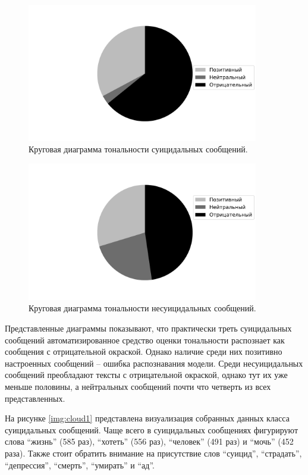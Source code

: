 \begin{figure}[H]
	\centering
	\includegraphics[width=0.9\textwidth]{inc/plots/sentiments_suicidal_monochrome.pdf}
	\caption{ Круговая диаграмма тональности суицидальных сообщений. }
	\label{img:sentiments1}
\end{figure}

\begin{figure}[H]
	\centering
	\includegraphics[width=0.9\textwidth]{inc/plots/sentiments_non_suicidal_monochrome.pdf}
	\caption{ Круговая диаграмма тональности несуицидальных сообщений. }
	\label{img:sentiments2}
\end{figure}

Представленные диаграммы показывают, что практически треть суицидальных сообщений автоматизированное средство оценки тональности распознает как сообщения с отрицательной окраской. Однако наличие среди них позитивно настроенных сообщений -- ошибка распознавания модели. Среди несуицидальных сообщений преобладают тексты с отрицательной окраской, однако тут их уже меньше половины, а нейтральных сообщений почти что четверть из всех представленных. 

На рисунке \ref{img:cloud1} представлена визуализация собранных данных класса суицидальных сообщений. Чаще всего в суицидальных сообщениях фигурируют слова ``жизнь'' (585 раз), ``хотеть'' (556 раз), ``человек'' (491 раз) и ``мочь'' (452 раза). Также стоит обратить внимание на присутствие слов ``суицид'', ``страдать'', ``депрессия'', ``смерть'', ``умирать'' и ``ад''.

